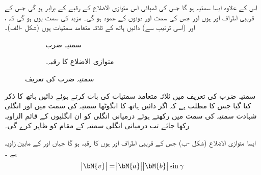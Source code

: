 اس کے علاوہ  ایسا سمتیہ ہو گا جس کی لمبائی اس متوازی الاضلاع کے رقبے کے برابر ہو گی جس کے قریبی اطراف  اور  ہوں اور جس کی سمت  اور  دونوں کے عمود ہو گی۔ مزید  کی سمت یوں ہو گی کہ ،  اور  (اسی ترتیب سے) دائیں ہاتھ کے ثلاثہ متعامد سمتیات ہوں (شکل -الف)۔
 \begin{figure}
\centering
\begin{subfigure}{0.45\textwidth}
\centering
{}
\caption{ سمتیہ ضرب}
\end{subfigure} \hfill
\begin{subfigure}{0.45\textwidth}
\centering
{}
\caption{ متوازی الاضلاع کا رقبہ۔}
\end{subfigure}
\caption{سمتیہ ضرب کی تعریف}
\label{شکل_تعریف_الجبرا_سمتی_ضرب}
\end{figure}
 سمتیہ ضرب کی تعریف میں ثلاثہ متعامد سمتیات کی بات کرتے ہوئے  دائیں ہاتھ کا ذکر کیا گیا جس کا مطلب ہے کہ  اگر دائیں ہاتھ کا انگوٹھا سمتیہ  کی سمت میں اور انگلی شہادت سمتیہ  کی سمت میں رکھتے ہوئے  درمیانی انگلی کو ان انگلیوں کے  قائم الزاویہ  رکھا جائے تب درمیانی انگلی سمتیہ  کے  مقام  کو ظاہر کرے گی۔ 

ایسا متوازی الاضلاع (شکل -ب) جس کے قریبی اطراف  اور  ہوں کا رقبہ
  ہو گا جہاں  اور  کے مابین زاویہ  ہے ۔
\begin{align}\label{مساوات_الجبرا_سمتی_ضرب_رقبہ}
\abs{\bM{v}}=\abs{\bM{a}}\abs{\bM{b}}\sin \gamma
\end{align}


